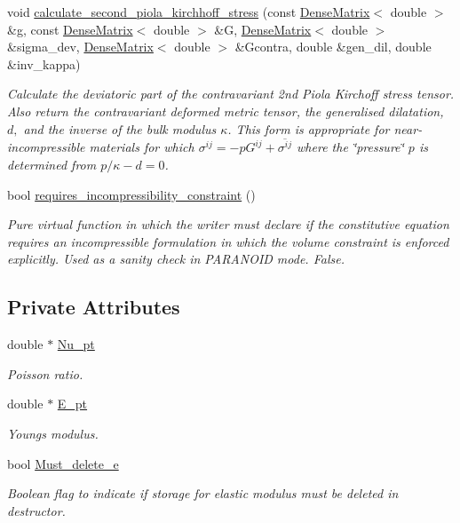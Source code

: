\begin{DoxyCompactItemize}
void \hyperlink{classoomph_1_1GeneralisedHookean_ad19b5e80755f5d8e5513c4199f62fe03}{calculate\+\_\+second\+\_\+piola\+\_\+kirchhoff\+\_\+stress} (const \hyperlink{classoomph_1_1DenseMatrix}{Dense\+Matrix}$<$ double $>$ \&g, const \hyperlink{classoomph_1_1DenseMatrix}{Dense\+Matrix}$<$ double $>$ \&G, \hyperlink{classoomph_1_1DenseMatrix}{Dense\+Matrix}$<$ double $>$ \&sigma\+\_\+dev, \hyperlink{classoomph_1_1DenseMatrix}{Dense\+Matrix}$<$ double $>$ \&Gcontra, double \&gen\+\_\+dil, double \&inv\+\_\+kappa)
\begin{DoxyCompactList}\small\item\em Calculate the deviatoric part of the contravariant 2nd Piola Kirchoff stress tensor. Also return the contravariant deformed metric tensor, the generalised dilatation, $ d, $ and the inverse of the bulk modulus $ \kappa$. This form is appropriate for near-\/incompressible materials for which $ \sigma^{ij} = -p G^{ij} + \overline{ \sigma^{ij}} $ where the \char`\"{}pressure\char`\"{} $ p $ is determined from $ p / \kappa - d =0 $. \end{DoxyCompactList}\item 
bool \hyperlink{classoomph_1_1GeneralisedHookean_a9ed467d8b7c838cb7fed8c861aa652e9}{requires\+\_\+incompressibility\+\_\+constraint} ()
\begin{DoxyCompactList}\small\item\em Pure virtual function in which the writer must declare if the constitutive equation requires an incompressible formulation in which the volume constraint is enforced explicitly. Used as a sanity check in P\+A\+R\+A\+N\+O\+ID mode. False. \end{DoxyCompactList}\end{DoxyCompactItemize}
\subsection*{Private Attributes}
\begin{DoxyCompactItemize}
\item 
double $\ast$ \hyperlink{classoomph_1_1GeneralisedHookean_ad719ee5ed6d1bcacb18fec3339ae98de}{Nu\+\_\+pt}
\begin{DoxyCompactList}\small\item\em Poisson ratio. \end{DoxyCompactList}\item 
double $\ast$ \hyperlink{classoomph_1_1GeneralisedHookean_a7a68b35f227848a065a7a844766b4eeb}{E\+\_\+pt}
\begin{DoxyCompactList}\small\item\em Young\textquotesingle{}s modulus. \end{DoxyCompactList}\item 
bool \hyperlink{classoomph_1_1GeneralisedHookean_a21d4ef7498c2efd5bf30fa0ecd0d7dd5}{Must\+\_\+delete\+\_\+e}
\begin{DoxyCompactList}\small\item\em Boolean flag to indicate if storage for elastic modulus must be deleted in destructor. \end{DoxyCompactList}\end{DoxyCompactItemize}
